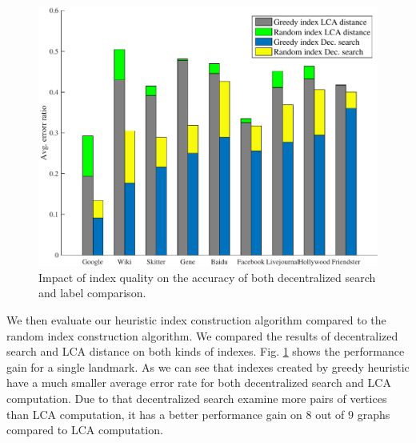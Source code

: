 

\begin{figure}[t]
    \centering
    \includegraphics[width=\linewidth]{./figures/accuracy_index.pdf}
    \caption{Impact of index quality on the accuracy of both decentralized search and label comparison.}
    \label{fig:accuracy_index}
\end{figure}

We then evaluate our heuristic index construction algorithm compared to the random index construction algorithm. We compared the results of decentralized search and LCA distance on both kinds of indexes. Fig. \ref{fig:accuracy_index} shows the performance gain for a single landmark. As we can see that indexes created by greedy heuristic have a much smaller average error rate for both decentralized search and LCA computation. Due to that decentralized search examine more pairs of vertices than LCA computation, it has a better performance gain on $8$ out of $9$ graphs compared to LCA computation.

